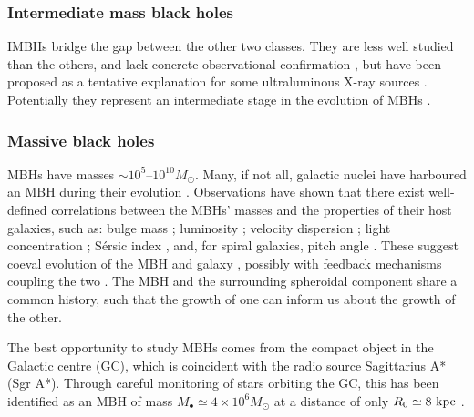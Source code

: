 \subsubsection{Intermediate mass black holes}

IMBHs bridge the gap between the other two classes. They are less well studied than the others, and lack concrete observational confirmation \citep{Miller2009a}, but have been proposed as a tentative explanation for some ultraluminous X-ray sources \citep{Feng2011}. Potentially they represent an intermediate stage in the evolution of MBHs \citep{Graham2013}.

\subsubsection{Massive black holes}

MBHs have masses $\sim10^5$--$10^{10} M_\odot$. Many, if not all, galactic nuclei have harboured an MBH during their evolution \citep{Lynden-Bell1971, Soltan1982, Rees1984}. Observations have shown that there exist well-defined correlations between the MBHs' masses and the properties of their host galaxies, such as: bulge mass \citep{Kormendy1995,Haring2004,Graham2012a}; luminosity \citep{Magorrian1998,Marconi2003,Graham2013}; velocity dispersion \citep{Ferrarese2000,Gebhardt2000,Tremaine2002,Graham2011}; light concentration \citep{Graham2001}; S{\'e}rsic index \citep{Graham2007a,Savorgnan2013}, and, for spiral galaxies, pitch angle \citep{Seigar2008,Berrier2013}. These suggest coeval evolution of the MBH and galaxy \citep{Peng2007, Jahnke2011}, possibly with feedback mechanisms coupling the two \citep{Haiman2004, Volonteri2009}. The MBH and the surrounding spheroidal component share a common history, such that the growth of one can inform us about the growth of the other.

The best opportunity to study MBHs comes from the compact object in the Galactic centre (GC), which is coincident with the radio source Sagittarius A* (Sgr A*). Through careful monitoring of stars orbiting the GC, this has been identified as an MBH of mass $M_\bullet \simeq 4 \times 10^6 M_\odot$ at a distance of only $R_0 \simeq 8~\mathrm{kpc}$ \citep{Gillessen2009, Meyer2012}.

